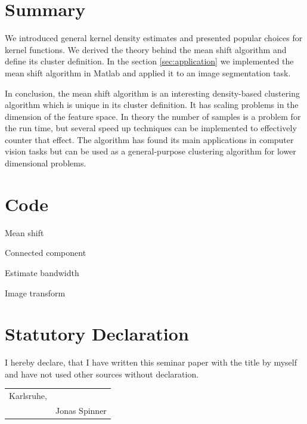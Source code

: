 \documentclass{article}
\begin{document}
\section{Summary}

We introduced general kernel density estimates and presented popular choices for kernel functions. We derived the theory behind the mean shift algorithm and define its cluster definition. In the section \ref{sec:application} we implemented the mean shift algorithm in Matlab and applied it to an image segmentation task.

In conclusion, the mean shift algorithm is an interesting density-based clustering algorithm which is unique in its cluster definition. It has scaling problems in the dimension of the feature space. In theory the number of samples is a problem for the run time, but several speed up techniques can be implemented to effectively counter that effect. The algorithm has found its main applications in computer vision tasks but can be used as a general-purpose clustering algorithm for lower dimensional problems.


\newpage




\appendix
\section{Code}
\begin{code}
	
	\caption[mean\_shift]{Mean shift}
	\label{code:mean_shift}
\end{code}

\begin{code}
	
	\caption[connected\_component]{Connected component}
	\label{code:connected_component}
\end{code}

\begin{code}
	
	\caption[estimate\_bandwidth]{Estimate bandwidth}
	\label{code:estimate_bandwidth}
\end{code}

\begin{code}
	
	\caption[image\_transform]{Image transform}
	\label{code:image_transform}
\end{code}

\newpage
\section*{Statutory Declaration}

I hereby declare, that I have written this seminar paper with the title \textbf{\thetitle} by myself and have not used other sources without declaration.


\begin{tabular}{@{}p{2in}p{2.5in}@{}}
	Karlsruhe, \thedate & \hrulefill \\
	& Jonas Spinner
\end{tabular}
\end{document}
